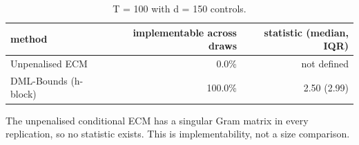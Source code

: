 \begin{table}[htbp]
\centering
\caption{T = 100 with d = 150 controls.}
\label{tab:tab11_ultra}
\begin{threeparttable}
\begin{tabular}{lrr}
\toprule
method & implementable across draws & statistic (median, IQR) \\
\midrule
Unpenalised ECM & 0.0\% & not defined \\
DML-Bounds (h-block) & 100.0\% & 2.50 (2.99) \\
\bottomrule
\end{tabular}

\begin{tablenotes}[flushleft]\small
\item The unpenalised conditional ECM has a singular Gram matrix in every replication, so no statistic exists. This is implementability, not a size comparison.
\end{tablenotes}
\end{threeparttable}
\end{table}